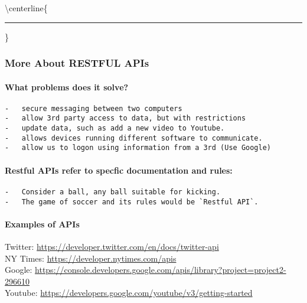 \documentclass[
  10pt,
]{article}
\begin{document}
\textbackslash centerline\{

\rule{3cm}{.4pt}

\}

\hypertarget{more-about-restful-apis}{%
\subsubsection{More About RESTFUL APIs}\label{more-about-restful-apis}}

\hypertarget{what-problems-does-it-solve}{%
\paragraph{What problems does it
solve?}\label{what-problems-does-it-solve}}

\begin{verbatim}
-   secure messaging between two computers
-   allow 3rd party access to data, but with restrictions
-   update data, such as add a new video to Youtube.
-   allows devices running different software to communicate.
-   allow us to logon using information from a 3rd (Use Google) 
\end{verbatim}

\hypertarget{restful-apis-refer-to-specfic-documentation-and-rules}{%
\paragraph{Restful APIs refer to specfic documentation and
rules:}\label{restful-apis-refer-to-specfic-documentation-and-rules}}

\begin{verbatim}
-   Consider a ball, any ball suitable for kicking.   
-   The game of soccer and its rules would be `Restful API`.
\end{verbatim}

\hypertarget{examples-of-apis}{%
\paragraph{Examples of APIs}\label{examples-of-apis}}

Twitter: \url{https://developer.twitter.com/en/docs/twitter-api}\\
NY Times: \url{https://developer.nytimes.com/apis}\\
Google:
\url{https://console.developers.google.com/apis/library?project=project2-296610}\\
Youtube: \url{https://developers.google.com/youtube/v3/getting-started}
\end{document}
